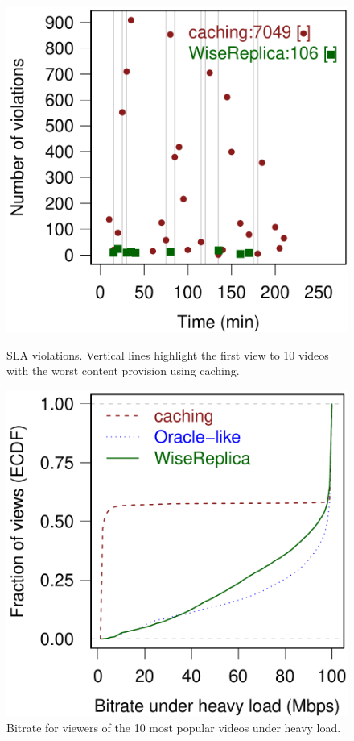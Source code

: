 \begin{figure}[htbp]
  \begin{minipage}[t]{0.48\linewidth}
     \includegraphics[width=.95\textwidth]{inputs/img/violations}
  \caption{SLA violations. Vertical lines highlight the first view to 10 videos with the worst content provision using caching.}
  \label{fig:violations}
  \end{minipage}
  \hspace{0.1cm}
  \begin{minipage}[t]{0.48\linewidth}
     \includegraphics[width=.95\textwidth]{inputs/img/ecdf_agg_bwd_under_heavy_load}
  \caption{Bitrate for viewers of the 10 most popular videos under heavy load.}
  \label{fig:avg_bitrate}
  \end{minipage}
\end{figure}
